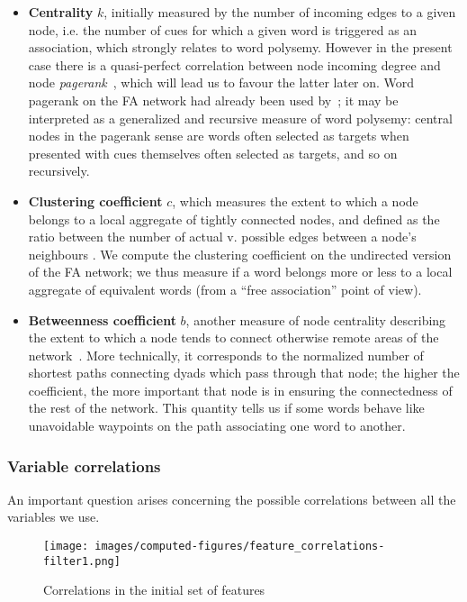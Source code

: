 \begin{itemize}
    \item \textbf{Centrality} $k$, initially measured by the number of incoming edges to a given node, i.e. the number of cues for which a given word is triggered as an association, which strongly relates to word polysemy.
    However in the present case there is a quasi-perfect correlation between node incoming degree and node \emph{pagerank}~\citep{Page99}, which will lead us to favour the latter later on. Word pagerank on the FA network had already been used by~\citet{Griffiths07}; it may be interpreted as a generalized and recursive measure of word polysemy: central nodes in the pagerank sense are words often selected as targets when presented with cues themselves often selected as targets, and so on recursively.
    \item \textbf{Clustering coefficient} $c$, which measures the extent to which a node belongs to a local aggregate of tightly connected nodes, and defined as the ratio between the number of actual v. possible edges between a node's neighbours \cite{watt-coll}.
    We compute the clustering coefficient on the undirected version of the FA network; we thus measure if a word belongs more or less to a local aggregate of equivalent words (from a ``free association'' point of view).
    \item \textbf{Betweenness coefficient} $b$, another measure of node centrality describing the extent to which a node tends to connect otherwise remote areas of the network~\citep{free:set}.
    More technically, it corresponds to the normalized number of shortest paths connecting dyads which pass through that node; the higher the coefficient, the more important that node is in ensuring the connectedness of the rest of the network.
    This quantity tells us if some words behave like unavoidable waypoints on the path associating one word to another.
\end{itemize}

\subsubsection{Variable correlations}

An important question arises concerning the possible correlations between all the variables we use.

\begin{figure}[!th]
    \centering
    \texttt{[image: images/computed-figures/feature\_correlations-filter1.png]}
    \caption{Correlations in the initial set of features }
    \label{fig:feature-corrs-initial}
\end{figure}

